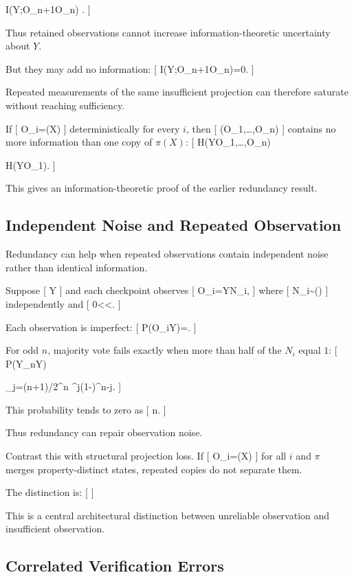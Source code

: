 \documentclass[11pt]{article}
\begin{document}
I(Y;O_{n+1}\mid O_{\leq n})
.
]

Thus retained observations cannot increase information-theoretic uncertainty about $Y$.

But they may add no information:
[
I(Y;O_{n+1}\mid O_{\leq n})=0.
]

Repeated measurements of the same insufficient projection can therefore saturate without reaching sufficiency.

If
[
O_i=\pi(X)
]
deterministically for every $i$, then
[
(O_1,\ldots,O_n)
]
contains no more information than one copy of $\pi(X)$:
[
H(Y\mid O_1,\ldots,O_n)

H(Y\mid O_1).
]

This gives an information-theoretic proof of the earlier redundancy result.

\subsection{Independent Noise and Repeated Observation}

Redundancy can help when repeated observations contain independent noise rather than identical information.

Suppose
[
Y
]
and each checkpoint observes
[
O_i=Y\oplus N_i,
]
where
[
N_i\sim{}(\varepsilon)
]
independently and
[
0<\varepsilon<.
]

Each observation is imperfect:
[
P(O_i\neq Y)=\varepsilon.
]

For odd $n$, majority vote fails exactly when more than half of the $N_i$ equal $1$:
[
P(\widehat Y_n\neq Y)

\sum_{j=(n+1)/2}^{n}
\varepsilon^j(1-\varepsilon)^{n-j}.
]

This probability tends to zero as
[
n\to\infty.
]

Thus redundancy can repair observation noise.

Contrast this with structural projection loss. If
[
O_i=\pi(X)
]
for all $i$ and $\pi$ merges property-distinct states, repeated copies do not separate them.

The distinction is:
[
]

This is a central architectural distinction between unreliable observation and insufficient observation.

\subsection{Correlated Verification Errors}
\end{document}

